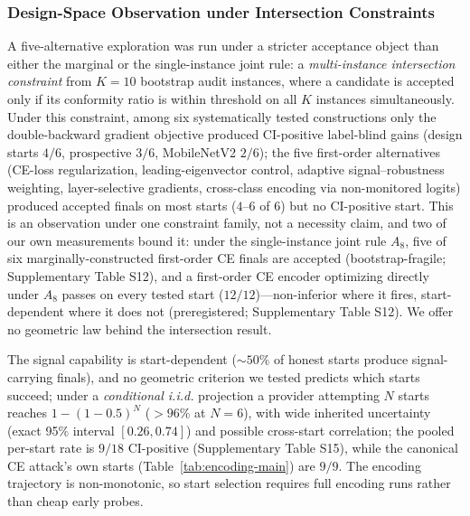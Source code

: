 \documentclass[lettersize,journal]{IEEEtran}
\begin{document}
\subsubsection{Design-Space Observation under Intersection Constraints}
A five-alternative exploration was run under a stricter
acceptance object than either the marginal or the
single-instance joint rule: a \emph{multi-instance
intersection constraint} from $K{=}10$ bootstrap audit
instances, where a candidate is accepted only if its
conformity ratio is within threshold on all $K$ instances
simultaneously. Under this constraint, among six
systematically tested constructions only the double-backward
gradient objective produced CI-positive label-blind gains
(design starts $4/6$, prospective $3/6$, MobileNetV2 $2/6$);
the five first-order alternatives (CE-loss regularization,
leading-eigenvector control, adaptive signal--robustness
weighting, layer-selective gradients, cross-class encoding
via non-monitored logits) produced accepted finals on most
starts ($4$--$6$ of $6$) but no CI-positive start. This is an
observation under one constraint family, not a necessity
claim, and two of our own measurements bound it: under the
single-instance joint rule $A_8$, five of six
marginally-constructed first-order CE finals are accepted
(bootstrap-fragile; Supplementary Table S12), and a
first-order CE encoder optimizing directly under $A_8$ passes
on every tested start ($12/12$)---non-inferior where it
fires, start-dependent where it does not (preregistered;
Supplementary Table S12). We offer no geometric law behind
the intersection result.

The signal capability is start-dependent (${\sim}50\%$ of
honest starts produce signal-carrying finals), and no
geometric criterion we tested predicts which starts succeed;
under a \emph{conditional i.i.d.} projection a provider
attempting $N$ starts reaches $1-(1-0.5)^N$ ($>96\%$ at
$N{=}6$), with wide inherited uncertainty (exact 95\%
interval $[0.26, 0.74]$) and possible cross-start
correlation; the pooled per-start rate is $9/18$ CI-positive
(Supplementary Table S15), while the canonical CE attack's
own starts (Table~\ref{tab:encoding-main}) are $9/9$. The
encoding trajectory is non-monotonic, so start selection
requires full encoding runs rather than cheap early probes.



\end{document}
